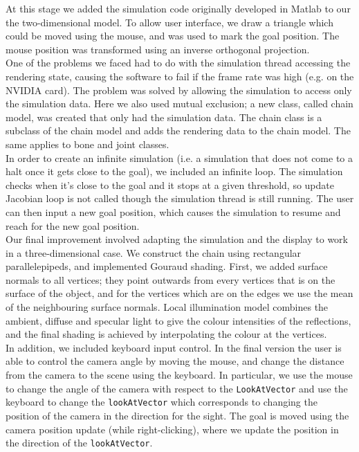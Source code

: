\documentclass[paper=a4, fontsize=11pt]{scrartcl} %
\numberwithin{equation}{section} %
\numberwithin{figure}{section} %
\numberwithin{table}{section} %
\begin{document}
At this stage we added the simulation code originally developed in Matlab to our the two-dimensional model. To allow user interface, we draw a triangle which could be moved using the mouse, and was used to mark the goal position. The mouse position was transformed using an inverse orthogonal projection. \\

One of the problems we faced had to do with the simulation thread accessing the rendering state, causing the software to fail if the frame rate was high (e.g. on the NVIDIA card). The problem was solved by allowing the simulation to access only the simulation data. Here we also used mutual exclusion; a new class, called chain model, was created that only had the simulation data. The chain class is a subclass of the chain model and adds the rendering data to the chain model. The same applies to bone and joint classes. \\

In order to create an infinite simulation (i.e. a simulation that does not come to a halt once it gets close to the goal), we included an infinite loop. The simulation checks when it's close to the goal and it stops at a given threshold, so update Jacobian loop is not called though the simulation thread is still running. The user can then input a new goal position, which causes the simulation to resume and reach for the new goal position. \\

Our final improvement involved adapting the simulation and the display to work in a three-dimensional case. We construct the chain using rectangular parallelepipeds, and implemented Gouraud shading. First, we added surface normals to all vertices; they point outwards from every vertices that is on the surface of the object, and for the vertices which are on the edges we use the mean of the neighbouring surface normals. Local illumination model combines the ambient, diffuse and specular light to give the colour intensities of the reflections, and the  final shading is achieved by interpolating the colour at the vertices. \\

In addition, we included keyboard input control. In the final version the user is able to control the camera angle by moving the mouse, and change the distance from the camera to the scene using the keyboard. In particular, we use the mouse to change the angle of the camera with respect to the \texttt{LookAtVector} and use the keyboard to change the \texttt{lookAtVector} which corresponds to changing the position of the camera in the direction for the sight. The goal is moved using the camera position update (while right-clicking), where we update the position in the direction of the \texttt{lookAtVector}.\\
\end{document}
